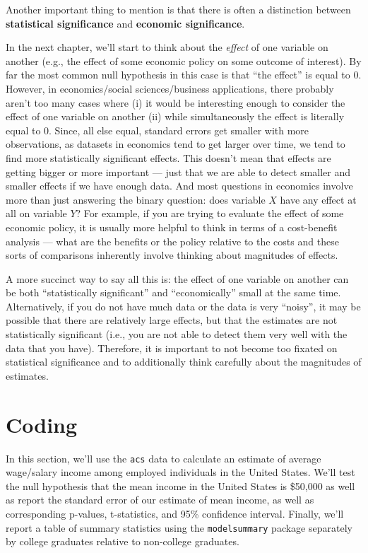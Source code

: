 \documentclass[
  letterpaper,
  DIV=11,
  numbers=noendperiod]{scrreprt}
\begin{document}
Another important thing to mention is that there is often a distinction
between \textbf{statistical significance} and \textbf{economic
significance}.

In the next chapter, we'll start to think about the \emph{effect} of one
variable on another (e.g., the effect of some economic policy on some
outcome of interest). By far the most common null hypothesis in this
case is that ``the effect'' is equal to 0. However, in economics/social
sciences/business applications, there probably aren't too many cases
where (i) it would be interesting enough to consider the effect of one
variable on another (ii) while simultaneously the effect is literally
equal to 0. Since, all else equal, standard errors get smaller with more
observations, as datasets in economics tend to get larger over time, we
tend to find more statistically significant effects. This doesn't mean
that effects are getting bigger or more important --- just that we are
able to detect smaller and smaller effects if we have enough data. And
most questions in economics involve more than just answering the binary
question: does variable \(X\) have any effect at all on variable \(Y\)?
For example, if you are trying to evaluate the effect of some economic
policy, it is usually more helpful to think in terms of a cost-benefit
analysis --- what are the benefits or the policy relative to the costs
and these sorts of comparisons inherently involve thinking about
magnitudes of effects.

A more succinct way to say all this is: the effect of one variable on
another can be both ``statistically significant'' and ``economically''
small at the same time. Alternatively, if you do not have much data or
the data is very ``noisy'', it may be possible that there are relatively
large effects, but that the estimates are not statistically significant
(i.e., you are not able to detect them very well with the data that you
have). Therefore, it is important to not become too fixated on
statistical significance and to additionally think carefully about the
magnitudes of estimates.

\section{Coding}\label{coding-1}

In this section, we'll use the \texttt{acs} data to calculate an
estimate of average wage/salary income among employed individuals in the
United States. We'll test the null hypothesis that the mean income in
the United States is \$50,000 as well as report the standard error of
our estimate of mean income, as well as corresponding p-values,
t-statistics, and 95\% confidence interval. Finally, we'll report a
table of summary statistics using the \texttt{modelsummary} package
separately by college graduates relative to non-college graduates.
\end{document}
